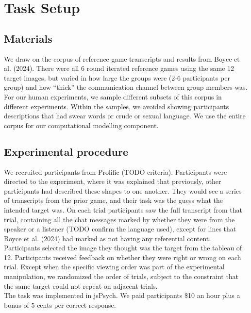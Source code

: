 \documentclass[10pt, letterpaper]{article}
\begin{document}
\section{Task Setup}\label{task-setup}

\subsection{Materials}\label{materials}

We draw on the corpus of reference game transcripts and results from
Boyce et al. (2024). There were all 6 round iterated reference games
using the same 12 target images, but varied in how large the groups were
(2-6 participants per group) and how ``thick'' the communication channel
between group members was. For our human experiments, we sample
different subsets of this corpus in different experiments. Within the
samples, we avoided showing participants descriptions that had swear
words or crude or sexual language. We use the entire corpus for our
computational modelling component.

\subsection{Experimental procedure}\label{experimental-procedure}

We recruited participants from Prolific (TODO criteria). Participants
were directed to the experiment, where it was explained that previously,
other participants had described these shapes to one another. They would
see a series of transcripts from the prior game, and their task was the
guess what the intended target was. On each trial participants saw the
full transcript from that trial, containing all the chat messages marked
by whether they were from the speaker or a listener (TODO confirm the
language used), except for lines that Boyce et al. (2024) had marked as
not having any referential content. Participants selected the image they
thought was the target from the tableau of 12. Participants received
feedback on whether they were right or wrong on each trial. Except when
the specific viewing order was part of the experimental manipulation, we
randomized the order of trials, subject to the constraint that the same
target could not repeat on adjacent trials.\\
The task was implemented in jsPsych. We paid participants \$10 an hour
plus a bonus of 5 cents per correct response.
\end{document}
